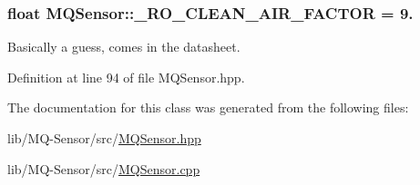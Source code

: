 \subsubsection[{\texorpdfstring{\+\_\+\+R\+O\+\_\+\+C\+L\+E\+A\+N\+\_\+\+A\+I\+R\+\_\+\+F\+A\+C\+T\+OR}{_RO_CLEAN_AIR_FACTOR}}]{\setlength{\rightskip}{0pt plus 5cm}float M\+Q\+Sensor\+::\+\_\+\+R\+O\+\_\+\+C\+L\+E\+A\+N\+\_\+\+A\+I\+R\+\_\+\+F\+A\+C\+T\+OR = 9.\hspace{0.3cm}{\ttfamily [protected]}}\hypertarget{class_m_q_sensor_adc7e7af2139868a784d31d27d73b7df3}{}\label{class_m_q_sensor_adc7e7af2139868a784d31d27d73b7df3}
Basically a guess, comes in the datasheet. 

Definition at line 94 of file M\+Q\+Sensor.\+hpp.



The documentation for this class was generated from the following files\+:\begin{DoxyCompactItemize}
\item 
lib/\+M\+Q-\/\+Sensor/src/\hyperlink{_m_q_sensor_8hpp}{M\+Q\+Sensor.\+hpp}\item 
lib/\+M\+Q-\/\+Sensor/src/\hyperlink{_m_q_sensor_8cpp}{M\+Q\+Sensor.\+cpp}\end{DoxyCompactItemize}
